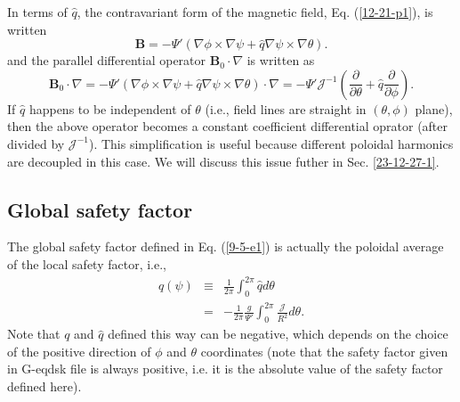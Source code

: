 \documentclass{llncs}
\begin{document}
In terms of $\hat{q}$, the contravariant form of the magnetic field, Eq.
(\ref{12-21-p1}), is written
\begin{equation}
  \label{18-3-9-a1} \mathbf{B}= - \Psi' (\nabla \phi \times \nabla \psi +
  \hat{q} \nabla \psi \times \nabla \theta) .
\end{equation}
and the parallel differential operator $\mathbf{B}_0 \cdot \nabla$ is written
as
\begin{equation}
  \label{18-8-21-e1} \mathbf{B}_0 \cdot \nabla = - \Psi' (\nabla \phi \times
  \nabla \psi + \hat{q} \nabla \psi \times \nabla \theta) \cdot \nabla = -
  \Psi' \mathcal{J}^{- 1} \left( \frac{\partial}{\partial \theta} + \hat{q}
  \frac{\partial}{\partial \phi} \right) .
\end{equation}
If $\hat{q}$ happens to be independent of $\theta$ (i.e., field lines are
straight in $(\theta, \phi)$ plane), then the above operator becomes a
constant coefficient differential oprator (after divided by $\mathcal{J}^{-
1}$). This simplification is useful because different poloidal harmonics are
decoupled in this case. We will discuss this issue futher in Sec.
\ref{23-12-27-1}.

\subsection{Global safety factor}

The global safety factor defined in Eq. (\ref{9-5-e1}) is actually the
poloidal average of the local safety factor, i.e.,
\begin{eqnarray}
  q (\psi) & \equiv & \frac{1}{2 \pi} \int_0^{2 \pi} \hat{q} d \theta 
  \label{4-10-p5}\\
  & = & - \frac{1}{2 \pi}  \frac{g}{\Psi'} \int_0^{2 \pi}
  \frac{\mathcal{J}}{R^2} d \theta .  \label{7-11-p1}
\end{eqnarray}
Note that $q$ and $\hat{q}$ defined this way can be negative, which depends on
the choice of the positive direction of $\phi$ and $\theta$ coordinates (note
that the safety factor given in G-eqdsk file is always positive, i.e. it is
the absolute value of the safety factor defined here).
\end{document}
